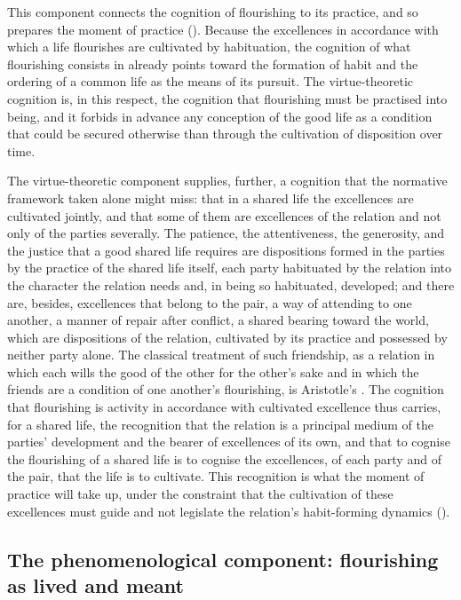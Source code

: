 This component connects the cognition of flourishing to its practice, and so prepares the moment of practice (). Because the excellences in accordance with which a life flourishes are cultivated by habituation, the cognition of what flourishing consists in already points toward the formation of habit and the ordering of a common life as the means of its pursuit. The virtue-theoretic cognition is, in this respect, the cognition that flourishing must be practised into being, and it forbids in advance any conception of the good life as a condition that could be secured otherwise than through the cultivation of disposition over time.

The virtue-theoretic component supplies, further, a cognition that the normative framework taken alone might miss: that in a shared life the excellences are cultivated jointly, and that some of them are excellences of the relation and not only of the parties severally. The patience, the attentiveness, the generosity, and the justice that a good shared life requires are dispositions formed in the parties by the practice of the shared life itself, each party habituated by the relation into the character the relation needs and, in being so habituated, developed; and there are, besides, excellences that belong to the pair, a way of attending to one another, a manner of repair after conflict, a shared bearing toward the world, which are dispositions of the relation, cultivated by its practice and possessed by neither party alone. The classical treatment of such friendship, as a relation in which each wills the good of the other for the other's sake and in which the friends are a condition of one another's flourishing, is Aristotle's \parencite{aristotle_ross}. The cognition that flourishing is activity in accordance with cultivated excellence thus carries, for a shared life, the recognition that the relation is a principal medium of the parties' development and the bearer of excellences of its own, and that to cognise the flourishing of a shared life is to cognise the excellences, of each party and of the pair, that the life is to cultivate. This recognition is what the moment of practice will take up, under the constraint that the cultivation of these excellences must guide and not legislate the relation's habit-forming dynamics ().

\subsection{The phenomenological component: flourishing as lived and meant}
\label{p11:sec:cog-phenom}

